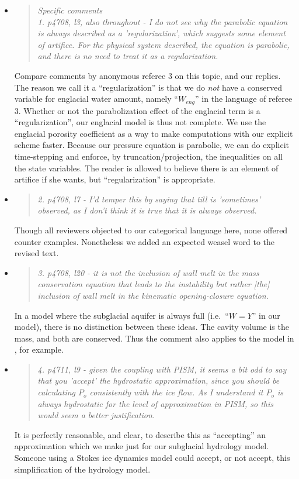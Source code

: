 \documentclass[11pt,reqno]{amsart}
\newcommand{\reply}[2]{
\medskip\medskip
\item  \begin{quote}
\emph{#1}
\end{quote}

\medskip
\noindent #2}
\begin{document}
\begin{itemize}
\reply{Specific comments\\
1. p4708, l3, also throughout - I do not see why the parabolic equation is always described as a 'regularization', which suggests some element of artifice.  For the physical system described, the equation is parabolic, and there is no need to treat it as a regularization.}
{Compare comments by anonymous referee 3 on this topic, and our replies.\\
\indent The reason we call it a ``regularization'' is that we do \emph{not} have a conserved variable for englacial water amount, namely ``$W_{eng}$'' in the language of referee 3.  Whether or not the parabolization effect of the englacial term is a ``regularization'', our englacial model is thus not complete.  We use the englacial porosity coefficient as a way to make computations with our explicit scheme faster.  Because our pressure equation is parabolic, we can do explicit time-stepping and enforce, by truncation/projection, the  inequalities on all the state variables.  The reader is allowed to believe there is an element of artifice if she wants, but ``regularization'' is appropriate.}

\reply{2. p4708, l7 - I'd temper this by saying that till is 'sometimes' observed, as I don't think it is true that it is always observed.}
{Though all reviewers objected to our categorical language here, none offered counter examples.  Nonetheless we added an expected weasel word to the revised text.}

\reply{3. p4708, l20 - it is not the inclusion of wall melt in the mass conservation equation that leads to the instability but rather [the] inclusion of wall melt in the kinematic opening-closure equation.}
{In a model where the subglacial aquifer is always full (i.e.~``$W=Y$'' in our model), there is no distinction between these ideas.  The cavity volume is the mass, and both are conserved.  Thus the comment also applies to the model in \cite{Werderetal2013}, for example.}

\reply{4. p4711, l9 - given the coupling with PISM, it seems a bit odd to say that you 'accept' the hydrostatic approximation, since you should be calculating $P_o$ consistently with the ice flow. As I understand it $P_o$ is always hydrostatic for the level of approximation in PISM, so this would seem a better justification.}
{It is perfectly reasonable, and clear, to describe this as ``accepting'' an approximation which we make just for our subglacial hydrology model.  Someone using a Stokes ice dynamics model could accept, or not accept, this simplification of the hydrology model.}


\end{itemize}
\end{document}
